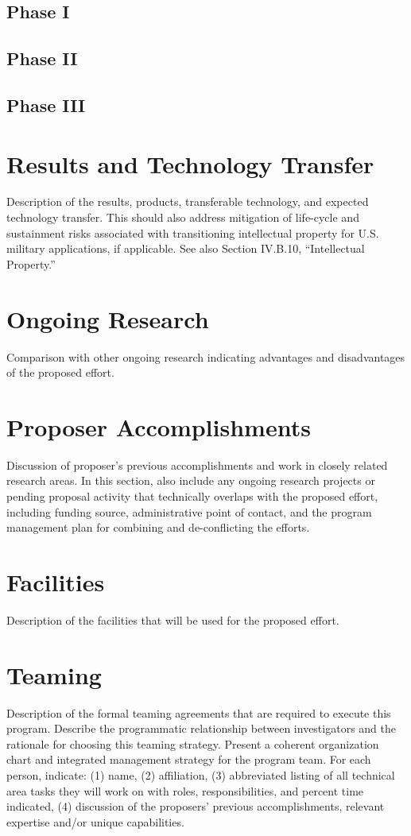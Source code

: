 \subsection{Phase I}

\subsection{Phase II}

\subsection{Phase III}

\section{Results and Technology Transfer}
Description of the results, products, transferable technology, and expected technology
transfer. This should also address mitigation of life-cycle and sustainment risks associated
with transitioning intellectual property for U.S. military applications, if applicable. See also
Section IV.B.10, “Intellectual Property.”

\section{Ongoing Research}
Comparison with other ongoing research indicating advantages and disadvantages of the
proposed effort.
\section{Proposer Accomplishments}
Discussion of proposer’s previous accomplishments and work in closely related research
areas. In this section, also include any ongoing research projects or pending proposal activity
that technically overlaps with the proposed effort, including funding source, administrative
point of contact, and the program management plan for combining and de-conflicting the
efforts.
\section{Facilities}
Description of the facilities that will be used for the proposed effort.
\section{Teaming}
Description of the formal teaming agreements that are required to execute this program.
Describe the programmatic relationship between investigators and the rationale for choosing
this teaming strategy. Present a coherent organization chart and integrated management
strategy for the program team. For each person, indicate: (1) name, (2) affiliation, (3)
abbreviated listing of all technical area tasks they will work on with roles, responsibilities,
and percent time indicated, (4) discussion of the proposers’ previous accomplishments,
relevant expertise and/or unique capabilities.
